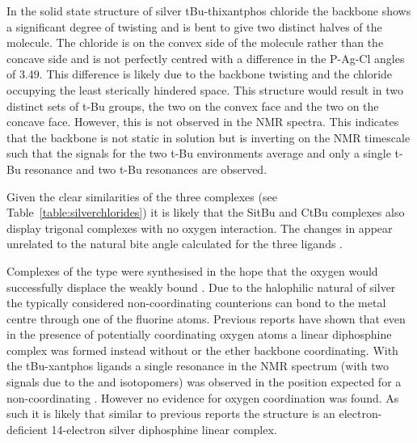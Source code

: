 In the solid state structure of silver tBu-thixantphos chloride the backbone shows a significant degree of twisting  and is bent to give two distinct halves of the molecule.  The chloride is on the convex side of the molecule rather than the  concave side and is not perfectly centred with a difference in the P-Ag-Cl angles of 3.49\degrees{}.  This difference is likely due to the backbone twisting and the chloride occupying the least sterically hindered space.  This structure would result in two distinct sets of t-Bu groups, the two on the convex face and the two on the concave face.  However, this is not observed in the NMR spectra.  This indicates that the backbone is not static in solution but is inverting on the NMR timescale such that the signals for the two t-Bu environments average and only a single t-Bu \proton{} resonance and two t-Bu \carbon{} resonances are observed.  

Given the clear similarities of the three complexes (see Table~\ref{table:silverchlorides}) it is likely that the SitBu and CtBu complexes also display trigonal complexes with no oxygen interaction.  The changes in \JAgP{} appear unrelated to the natural bite angle calculated for the three ligands .  

Complexes of the type  were synthesised in the hope that the oxygen would successfully displace the weakly bound .  Due to the halophilic natural of silver the typically considered non-coordinating  counterions can bond to the metal centre through one of the fluorine atoms.  Previous reports have shown that even in the presence of potentially coordinating oxygen atoms a linear diphosphine complex was formed instead without  or the ether backbone coordinating.\cite{Heuer2000, Camalli1984}  With the tBu-xantphos ligands a single resonance in the \fluorine{} NMR spectrum (with two signals due to the \Bten{} and \Beleven{} isotopomers) was observed in the position expected for a non-coordinating .  However no evidence for oxygen coordination was found.  As such it is likely that similar to previous reports the structure is an electron-deficient 14-electron silver diphosphine linear complex.  

